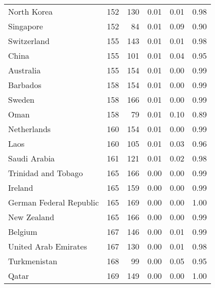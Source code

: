 \begin{longtable}[t]{lrrrrr}
North Korea & 152 & 130 & 0.01 & 0.01 & 0.98\\
Singapore & 152 & 84 & 0.01 & 0.09 & 0.90\\
Switzerland & 155 & 143 & 0.01 & 0.01 & 0.98\\
China & 155 & 101 & 0.01 & 0.04 & 0.95\\
Australia & 155 & 154 & 0.01 & 0.00 & 0.99\\
\addlinespace
Barbados & 158 & 154 & 0.01 & 0.00 & 0.99\\
Sweden & 158 & 166 & 0.01 & 0.00 & 0.99\\
Oman & 158 & 79 & 0.01 & 0.10 & 0.89\\
Netherlands & 160 & 154 & 0.01 & 0.00 & 0.99\\
Laos & 160 & 105 & 0.01 & 0.03 & 0.96\\
\addlinespace
Saudi Arabia & 161 & 121 & 0.01 & 0.02 & 0.98\\
Trinidad and Tobago & 165 & 166 & 0.00 & 0.00 & 0.99\\
Ireland & 165 & 159 & 0.00 & 0.00 & 0.99\\
German Federal Republic & 165 & 169 & 0.00 & 0.00 & 1.00\\
New Zealand & 165 & 166 & 0.00 & 0.00 & 0.99\\
\addlinespace
Belgium & 167 & 146 & 0.00 & 0.01 & 0.99\\
United Arab Emirates & 167 & 130 & 0.00 & 0.01 & 0.98\\
Turkmenistan & 168 & 99 & 0.00 & 0.05 & 0.95\\
Qatar & 169 & 149 & 0.00 & 0.00 & 1.00\\
\bottomrule
\end{longtable}
